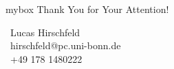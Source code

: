 \documentclass[aspectratio=169]{beamer}
\begin{document}
\begin{frame}[c]
    \begin{center}
            \begin{center}
        \begin{beamercolorbox}[wd=\textwidth, sep=0.2em, center, rounded=true]{mybox}
            \Huge{Thank You for Your Attention!}
        \end{beamercolorbox}
    \end{center}
        
        \vspace{1em}

        \vspace{2em}

        {\color{darkbordeaux}
            \normalsize
            \faUser\ Lucas Hirschfeld\\
            \faEnvelope\ hirschfeld@pc.uni-bonn.de\\
            \faPhone\ +49 178 1480222
        }
    \end{center}
\end{frame}
\end{document}
